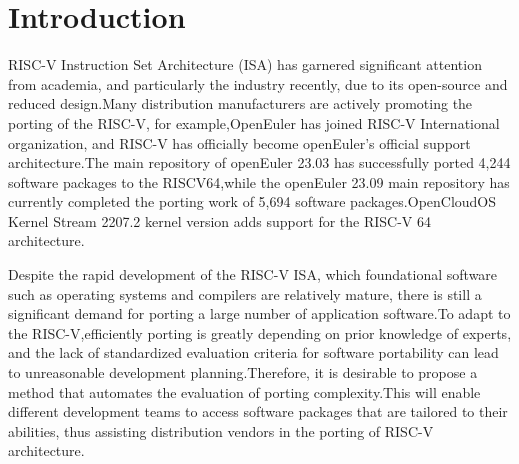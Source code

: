 \documentclass[sigconf,screen,review,anonymous]{acmart}
\begin{document}





\maketitle

\section{Introduction}
RISC-V Instruction Set Architecture (ISA) has garnered significant attention from academia, and particularly the industry recently, due to its open-source and reduced design\citep{2014The}.Many distribution manufacturers are actively promoting the porting of the RISC-V, for example,OpenEuler has joined RISC-V International organization, and RISC-V has officially become openEuler's official support architecture.The main repository of openEuler 23.03 has successfully ported 4,244 software packages to the RISCV64,while the openEuler 23.09 main repository has currently completed the porting work of 5,694 software packages\citep{osti_1560132}.OpenCloudOS Kernel Stream 2207.2 kernel version adds support for the RISC-V 64 architecture\citep{osti_1560133}.  

Despite the rapid development of the RISC-V ISA, which foundational software such as operating systems and compilers are relatively mature, there is still a significant demand for porting a large number of application software\citep{2019Notary}.To adapt to the RISC-V,efficiently porting is greatly depending on prior knowledge of experts, and the lack of standardized evaluation criteria for software portability can lead to unreasonable development planning.Therefore, it is desirable to propose a method that automates the evaluation of porting complexity.This will enable different development teams to access software packages that are tailored to their abilities, thus assisting distribution vendors in the porting of RISC-V architecture.  
\end{document}

